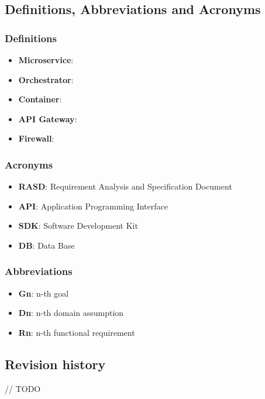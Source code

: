 \subsection{Definitions, Abbreviations and Acronyms}
\subsubsection{Definitions}
\begin{itemize}
	\item \textbf{Microservice}:
	\item \textbf{Orchestrator}: 
	\item \textbf{Container}: 
	\item \textbf{API Gateway}:
	\item \textbf{Firewall}:
\end{itemize}

\subsubsection{Acronyms}
\begin{itemize}
	\item \textbf{RASD}: Requirement Analysis and Specification Document
	\item \textbf{API}: Application Programming Interface
	\item \textbf{SDK}: Software Development Kit
	\item \textbf{DB}: Data Base
\end{itemize}

\subsubsection{Abbreviations}
\begin{itemize}
	\item \textbf{Gn}: n-th goal
	\item \textbf{Dn}: n-th domain assumption
	\item \textbf{Rn}: n-th functional requirement
\end{itemize}


\subsection{Revision history}
 // TODO
 
